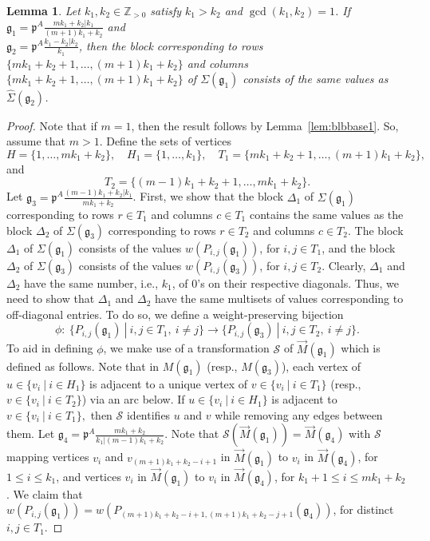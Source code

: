 \documentclass[letterpaper,10pt]{article}
\newtheorem{lemma}[theorem]{Lemma}
\begin{document}
\begin{lemma}\label{lem:blbgen}
Let $k_1,k_2\in\mathbb{Z}_{>0}$ satisfy $k_1>k_2$ and $\gcd(k_1,k_2)=1$. If $\mathfrak{g}_1=\mathfrak{p}^A\frac{mk_1+k_2|k_1}{(m+1)k_1+k_2}$ and \\ $\mathfrak{g}_2=\mathfrak{p}^A\frac{k_1-k_2|k_2}{k_1}$, then the block corresponding to rows $\{mk_1+k_2+1,\hdots,(m+1)k_1+k_2\}$ and columns $\{mk_1+k_2+1,\hdots,(m+1)k_1+k_2\}$ of $\Sigma(\mathfrak{g}_1)$ consists of the same values as $\widehat{\Sigma}(\mathfrak{g}_2)$.
\end{lemma}
\begin{proof}
Note that if $m=1$, then the result follows by Lemma~\ref{lem:blbbase1}. So, assume that $m>1$. Define the sets of vertices $$H=\{1,\hdots,mk_1+k_2\},\quad H_1=\{1,\hdots,k_1\},\quad T_1=\{mk_1+k_2+1,\hdots,(m+1)k_1+k_2\},$$ and $$T_2=\{(m-1)k_1+k_2+1,\hdots,mk_1+k_2\}.$$
Let $\mathfrak{g}_3=\mathfrak{p}^A\frac{(m-1)k_1+k_2|k_1}{mk_1+k_2}$. First, we show that the block $\Delta_1$ of $\Sigma(\mathfrak{g}_1)$ corresponding to rows $r\in T_1$ and columns $c\in T_1$ contains the same values as the block $\Delta_2$ of $\Sigma(\mathfrak{g}_3)$ corresponding to rows $r\in T_2$ and columns $c\in T_2$. The block $\Delta_1$ of $\Sigma(\mathfrak{g}_1)$ consists of the values $w(P_{i,j}(\mathfrak{g}_1))$, for $i,j\in T_1$, and the block $\Delta_2$ of $\Sigma(\mathfrak{g}_3)$ consists of the values $w(P_{i,j}(\mathfrak{g}_3))$, for $i,j\in T_2$. Clearly, $\Delta_1$ and $\Delta_2$ have the same number, i.e., $k_1$, of 0's on their respective diagonals. Thus, we need to show that $\Delta_1$ and $\Delta_2$ have the same multisets of values corresponding to off-diagonal entries. To do so, we define a weight-preserving bijection 
$$\phi:~\{P_{i,j}(\mathfrak{g}_1)~|~i,j\in T_1,~i\neq j\}\to \{P_{i,j}(\mathfrak{g}_3)~|~i,j\in T_2,~i\neq j\}.$$ To aid in defining $\phi$, we make use of a transformation $\mathcal{S}$ of $\overrightarrow{M}(\mathfrak{g}_1)$ which is defined as follows. Note that in $M(\mathfrak{g}_1)$ (resp., $M(\mathfrak{g}_3)$), each vertex of $u\in\{v_i~|~i\in H_1\}$ is adjacent to a unique vertex of $v\in\{v_i~|~i\in T_1\}$ (resp., $v\in\{v_i~|~i\in T_2\}$) via an arc below. If $u\in \{v_i~|~i\in H_1\}$ is adjacent to $v\in \{v_i~|~i\in T_1\},$ then $\mathcal{S}$ identifies $u$ and $v$ while removing any edges between them. Let $\mathfrak{g}_4=\mathfrak{p}^A\frac{mk_1+k_2}{k_1|(m-1)k_1+k_2}$. Note that $\mathcal{S}(\overrightarrow{M}(\mathfrak{g}_1))=\overrightarrow{M}(\mathfrak{g}_4)$ with  $\mathcal{S}$ mapping vertices $v_{i}$ and $v_{(m+1)k_1+k_2-i+1}$ in  $\overrightarrow{M}(\mathfrak{g}_1)$ to $v_{i}$ in $\overrightarrow{M}(\mathfrak{g}_4)$, for $1\le i\le k_1$, and vertices $v_i$ in $\overrightarrow{M}(\mathfrak{g}_1)$ to $v_i$ in $\overrightarrow{M}(\mathfrak{g}_4)$, for $k_1+1\le i\le mk_1+k_2$. We claim that $w(P_{i,j}(\mathfrak{g}_1))=w(P_{(m+1)k_1+k_2-i+1,(m+1)k_1+k_2-j+1}(\mathfrak{g}_4))$, for distinct $i,j\in T_1$.


\end{proof}
\end{document}
